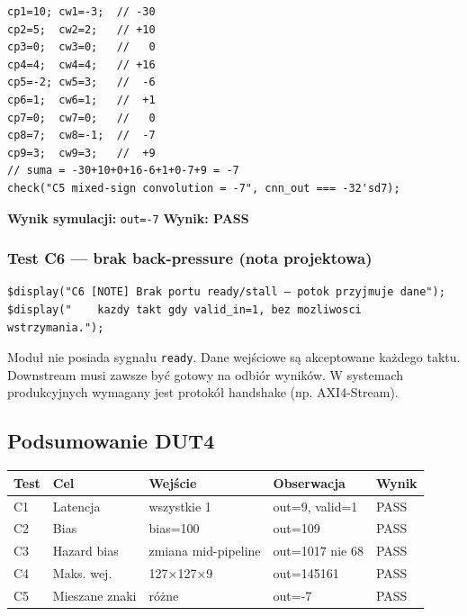 \documentclass[12pt,a4paper]{article}
\begin{document}
\begin{lstlisting}
cp1=10; cw1=-3;  // -30
cp2=5;  cw2=2;   // +10
cp3=0;  cw3=0;   //   0
cp4=4;  cw4=4;   // +16
cp5=-2; cw5=3;   //  -6
cp6=1;  cw6=1;   //  +1
cp7=0;  cw7=0;   //   0
cp8=7;  cw8=-1;  //  -7
cp9=3;  cw9=3;   //  +9
// suma = -30+10+0+16-6+1+0-7+9 = -7
check("C5 mixed-sign convolution = -7", cnn_out === -32'sd7);
\end{lstlisting}

\textbf{Wynik symulacji:} \texttt{out=-7} \quad \textbf{Wynik: PASS}

\subsubsection*{Test C6 — brak back-pressure (nota projektowa)}

\begin{lstlisting}
$display("C6 [NOTE] Brak portu ready/stall — potok przyjmuje dane");
$display("    kazdy takt gdy valid_in=1, bez mozliwosci wstrzymania.");
\end{lstlisting}

\begin{infobox}
Moduł nie posiada sygnału \texttt{ready}. Dane wejściowe są akceptowane każdego taktu. Downstream musi zawsze być gotowy na odbiór wyników. W systemach produkcyjnych wymagany jest protokół handshake (np. AXI4-Stream).
\end{infobox}

\subsection{Podsumowanie DUT4}

\begin{center}
\begin{tabular}{lllll}
\toprule
\textbf{Test} & \textbf{Cel} & \textbf{Wejście} & \textbf{Obserwacja} & \textbf{Wynik} \\
\midrule
C1 & Latencja & wszystkie 1 & out=9, valid=1 & PASS \\
C2 & Bias & bias=100 & out=109 & PASS \\
C3 & Hazard bias & zmiana mid-pipeline & out=1017 nie 68 & PASS \\
C4 & Maks. wej. & 127×127×9 & out=145161 & PASS \\
C5 & Mieszane znaki & różne & out=-7 & PASS \\
\bottomrule
\end{tabular}
\end{center}
\end{document}
